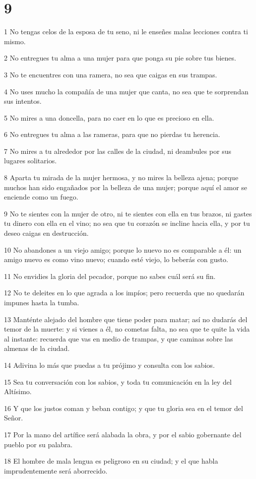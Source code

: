 \chapter{9}

\par 1 No tengas celos de la esposa de tu seno, ni le enseñes malas lecciones contra ti mismo.
\par 2 No entregues tu alma a una mujer para que ponga su pie sobre tus bienes.
\par 3 No te encuentres con una ramera, no sea que caigas en sus trampas.
\par 4 No uses mucho la compañía de una mujer que canta, no sea que te sorprendan sus intentos.
\par 5 No mires a una doncella, para no caer en lo que es precioso en ella.
\par 6 No entregues tu alma a las rameras, para que no pierdas tu herencia.
\par 7 No mires a tu alrededor por las calles de la ciudad, ni deambules por sus lugares solitarios.
\par 8 Aparta tu mirada de la mujer hermosa, y no mires la belleza ajena; porque muchos han sido engañados por la belleza de una mujer; porque aquí el amor se enciende como un fuego.
\par 9 No te sientes con la mujer de otro, ni te sientes con ella en tus brazos, ni gastes tu dinero con ella en el vino; no sea que tu corazón se incline hacia ella, y por tu deseo caigas en destrucción.
\par 10 No abandones a un viejo amigo; porque lo nuevo no es comparable a él: un amigo nuevo es como vino nuevo; cuando esté viejo, lo beberás con gusto.
\par 11 No envidies la gloria del pecador, porque no sabes cuál será su fin.
\par 12 No te deleites en lo que agrada a los impíos; pero recuerda que no quedarán impunes hasta la tumba.
\par 13 Manténte alejado del hombre que tiene poder para matar; así no dudarás del temor de la muerte: y si vienes a él, no cometas falta, no sea que te quite la vida al instante: recuerda que vas en medio de trampas, y que caminas sobre las almenas de la ciudad.
\par 14 Adivina lo más que puedas a tu prójimo y consulta con los sabios.
\par 15 Sea tu conversación con los sabios, y toda tu comunicación en la ley del Altísimo.
\par 16 Y que los justos coman y beban contigo; y que tu gloria sea en el temor del Señor.
\par 17 Por la mano del artífice será alabada la obra, y por el sabio gobernante del pueblo por su palabra.
\par 18 El hombre de mala lengua es peligroso en su ciudad; y el que habla imprudentemente será aborrecido.

